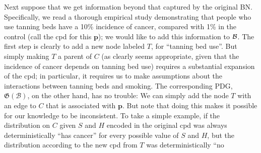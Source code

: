 \documentclass{article}
\theoremstyle{plain}
\theoremstyle{definition}
\newenvironment{example}
	{\pushQED{\qed}\renewcommand{\qedsymbol}{$\triangle$}\examplex}
	{\popQED\endexamplex%
}
\theoremstyle{remark}
\newcommand\mat[1]{\mathbf{#1}}
\newcommand{\dg}[1]{\mathfrak{#1}}
\newcommand{\PDGof}[1]{\dg G(#1)}
\numberwithin{equation}{section}
\begin{document}
\begin{example}[emulating a BN]
	
Next suppose that we get information beyond that captured by the
original BN.  Specifically, we read a thorough empirical study 
        demonstrating that people who use tanning beds have a
                10\% incidence of cancer, compared with 1\% in the
                control (call the cpd for this $\mat p$); we would
                like to add this information to $\cal B$.  
		The first step is clearly to add a new node labeled
                $T$, for ``tanning bed use''.  But simply making $T$ a
                parent of $C$ (as clearly seems appropriate, given
                that 
                the incidence of cancer depends on tanning bed use)
            requires a substantial expansion of the cpd; in
                particular, it requires us to make assumptions about
                the interactions 
                between tanning beds and smoking.  
%		
	The corresponding PDG, $\PDGof{{\mathcal B}}$, on the other hand, has no trouble:
		We can simply add the node $T$ with an edge to $C$ that is associated with $\mat p$. 
%		
                But note that doing this makes it possible for our
                knowledge to be 
                inconsistent. To take a simple example, if the
                distribution on $C$ 
                given $S$ and $H$ encoded in the original cpd was always
                deterministically ``has cancer'' for every possible
                value of $S$ and $H$, but the distribution according
                to the new cpd from $T$ was deterministically ``no

\end{example}
\end{document}
